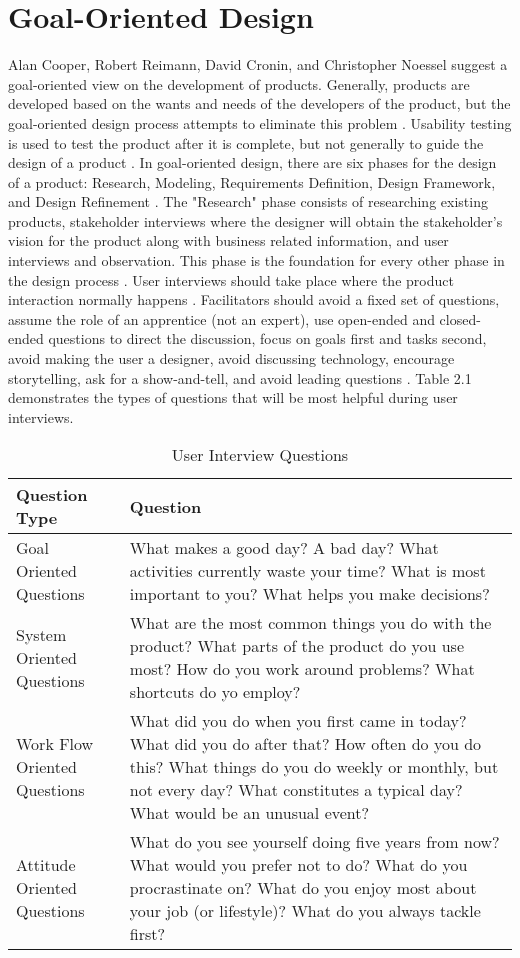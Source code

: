 \section{Goal-Oriented Design}
Alan Cooper, Robert Reimann, David Cronin, and Christopher Noessel \cite{aboutface} suggest a goal-oriented view on the development of products\cite{aboutface}. Generally, products are developed based on the wants and needs of the developers of the product, but the goal-oriented design process attempts to eliminate this problem \cite{aboutface}.  Usability testing is used to test the product after it is complete, but not generally to guide the design of a product \cite{aboutface}. In goal-oriented design, there are six phases for the design of a product: Research, Modeling, Requirements Definition, Design Framework, and Design Refinement \cite{aboutface}. The "Research" phase consists of researching existing products, stakeholder interviews where the designer will obtain the stakeholder's vision for the product along with business related information, and user interviews and observation. This phase is the foundation for every other phase in the design process \cite{aboutface}. User interviews should take place where the product interaction normally happens \cite{aboutface}. Facilitators should avoid a fixed set of questions, assume the role of an apprentice (not an expert), use open-ended and closed-ended questions to direct the discussion, focus on goals first and tasks second, avoid making the user a designer, avoid discussing technology, encourage storytelling, ask for a show-and-tell, and avoid leading questions \cite{aboutface}. Table 2.1 demonstrates the types of questions that will be most helpful during user interviews.\\

\begin{table}
	\caption{User Interview Questions \cite{aboutface}}
	\begin{tabular}{ | m{15em} | m{8cm}| } 
		\hline
		Question Type & Question\\ [.05ex] 
		\hline\hline
		Goal Oriented Questions & What makes a good day? A bad day? 
		What activities currently waste your time? 
		What is most important to you? 
		What helps you make decisions?\\ 
		\hline
		System Oriented Questions & What are the most common things you do with the product? 
		What parts of the product do you use most?
		How do you work around problems?
		What shortcuts do yo employ?\\ 
		\hline
		Work Flow Oriented Questions & What did you do when you first came in today? What did you do after that? 
		How often do you do this? What things do you do weekly or monthly, but not every day?
		What constitutes a typical day? What would be an unusual event? \\
		\hline
		Attitude Oriented Questions & What do you see yourself doing five years from now?
		What would you prefer not to do? What do you procrastinate on?
		What do you enjoy most about your job (or lifestyle)? What do you always tackle first?\\ 
		\hline
	\end{tabular}
\end{table}

